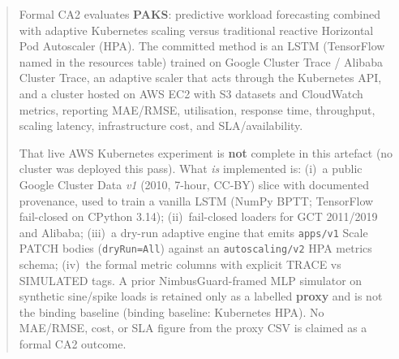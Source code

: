 \begin{abstract}
Formal CA2 evaluates \textbf{PAKS}: predictive workload forecasting combined with adaptive Kubernetes scaling versus traditional reactive Horizontal Pod Autoscaler (HPA). The committed method is an LSTM (TensorFlow named in the resources table) trained on Google Cluster Trace / Alibaba Cluster Trace, an adaptive scaler that acts through the Kubernetes API, and a cluster hosted on AWS EC2 with S3 datasets and CloudWatch metrics, reporting MAE/RMSE, utilisation, response time, throughput, scaling latency, infrastructure cost, and SLA/availability.

That live AWS Kubernetes experiment is \textbf{not} complete in this artefact (no cluster was deployed this pass). What \emph{is} implemented is: (i)~a public Google Cluster Data \emph{v1} (2010, 7-hour, CC-BY) slice with documented provenance, used to train a vanilla LSTM (NumPy BPTT; TensorFlow fail-closed on CPython 3.14); (ii)~fail-closed loaders for GCT 2011/2019 and Alibaba; (iii)~a dry-run adaptive engine that emits \texttt{apps/v1} Scale PATCH bodies (\texttt{dryRun=All}) against an \texttt{autoscaling/v2} HPA metrics schema; (iv)~the formal metric columns with explicit TRACE vs SIMULATED tags. A prior NimbusGuard-framed MLP simulator on synthetic sine/spike loads is retained only as a labelled \textbf{proxy} and is not the binding baseline (binding baseline: Kubernetes HPA). No MAE/RMSE, cost, or SLA figure from the proxy CSV is claimed as a formal CA2 outcome.
\end{abstract}
